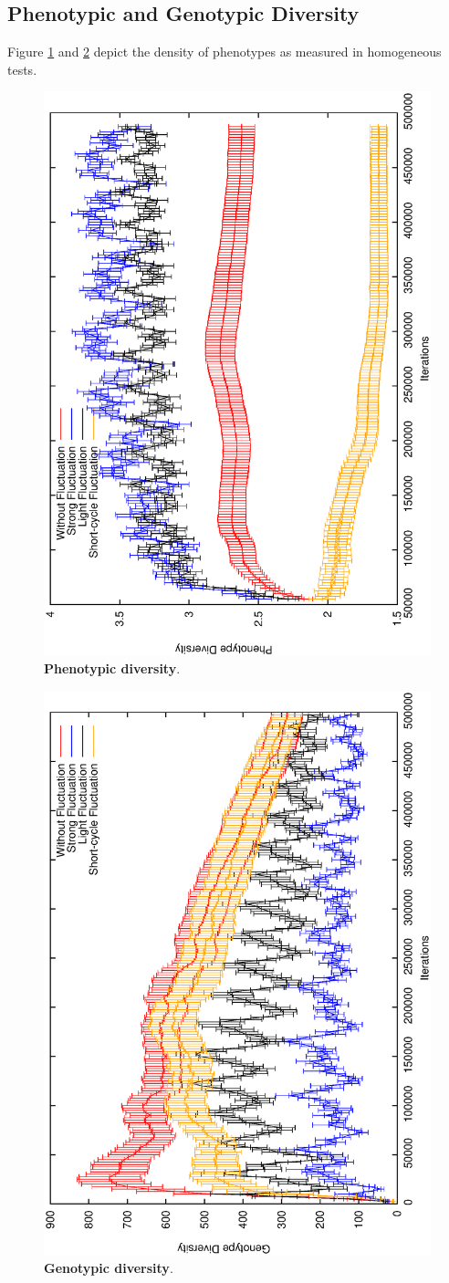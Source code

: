 \subsection{Phenotypic and Genotypic Diversity}
Figure \ref{fig:phenodiv} and \ref{fig:genodiv} depict the density of phenotypes as measured in homogeneous tests. 



\begin{figure}[h]
\centering
\includegraphics[width=0.7\columnwidth, angle =-90 ]{img/PhenoDiv}
\caption{\textbf{Phenotypic diversity}.}
\label{fig:phenodiv}
\end{figure}

\begin{figure}[h]
\centering
\includegraphics[width=0.7\columnwidth, angle =-90 ]{img/GenoDiversity}
\caption{\textbf{Genotypic diversity}.}
\label{fig:genodiv}
\end{figure}